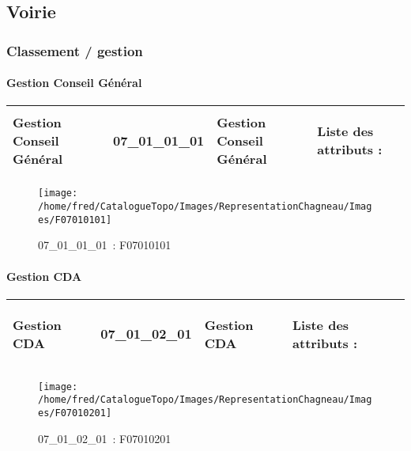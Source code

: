 \documentclass[12pt,titlepage,oneside]{book}
\begin{document}
\subsection{Voirie}
\subsubsection{\large Classement / gestion}
\paragraph{Gestion Conseil Général}
\noindent
\vspace{\baselineskip}

\renewcommand{\arraystretch}{1.2}
\begin{supertabular}{|p{10cm}|c|p{13cm}|p{12cm}|}
 Gestion Conseil Général & 07\_01\_01\_01 & Gestion Conseil Général & Liste des attributs :
\begin{enumerate}
\end{enumerate}
\\
\hline
\end{supertabular}
\begin{figure}[h!]
  \hfill         %
  \begin{minipage}[t]{3cm}
    \begin{center}
      \texttt{[image: /home/fred/CatalogueTopo/Images/RepresentationChagneau/Images/F07010101]}
      \caption[~07\_01\_01\_01]{\small{07\_01\_01\_01~:} \tiny{F07010101}}\label{F07010101}
    \end{center}
  \end{minipage}
\end{figure}


\paragraph{Gestion CDA}
\noindent
\vspace{\baselineskip}

\renewcommand{\arraystretch}{1.2}
\begin{supertabular}{|p{10cm}|c|p{13cm}|p{12cm}|}
 Gestion CDA & 07\_01\_02\_01 & Gestion CDA & Liste des attributs :
\begin{enumerate}
\end{enumerate}
\\
\hline
\end{supertabular}
\begin{figure}[h!]
  \hfill         %
  \begin{minipage}[t]{3cm}
    \begin{center}
      \texttt{[image: /home/fred/CatalogueTopo/Images/RepresentationChagneau/Images/F07010201]}
      \caption[~07\_01\_02\_01]{\small{07\_01\_02\_01~:} \tiny{F07010201}}\label{F07010201}
    \end{center}
  \end{minipage}
\end{figure}
\end{document}
